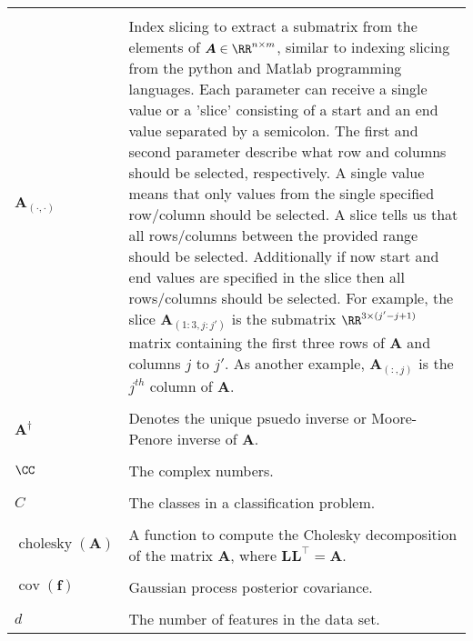 \begin{longtable}{lp{}}
    \\\\
    $\bm{A}_{(\cdot,\cdot)}$                                                                                   & Index slicing to extract a submatrix from the elements of $\bm{A} \in \RR^{n \times m}$, similar to indexing slicing from the python and Matlab programming languages. Each parameter can receive a single value or a 'slice' consisting of a start and an end value separated by a semicolon. The first and second parameter describe what row and columns should be selected, respectively. A single value means that only values from the single specified row/column should be selected. A slice tells us that all rows/columns between the provided range should be selected. Additionally if now start and end values are specified in the slice then all rows/columns should be selected. For example, the slice $\bm{A}_{(1:3,j:j')}$ is the submatrix $\RR^{3 \times (j' - j + 1)}$ matrix containing the first three rows of $\bm{A}$ and columns $j$ to $j'$. As another example, $\bm{A}_{(:,j)}$ is the $j^{th}$ column of $\bm{A}$.
    \\\\
    $\bm{A}^{\dagger}$                                                                                         & Denotes the unique psuedo inverse or Moore-Penore inverse of $\bm{A}$.
    \\\\
    $\CC$                                                                                                      & The complex numbers.
    \\\\
    $C$                                                                                                        & The classes in a classification problem.
    \\\\
    $\operatorname{cholesky} \left( \bm{A} \right)$                                                            & A function to compute the Cholesky decomposition of the matrix $\bm{A}$, where $\bm{L} \bm{L}^{\intercal} = \bm{A}$.
    \\\\
    $\operatorname{cov} \left( \bm{f} \right)$                                                                 & Gaussian process posterior covariance.
    \\\\
    $d$                                                                                                        & The number of features in the data set.

\end{longtable}
